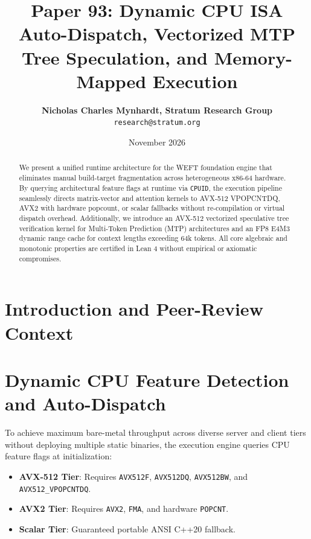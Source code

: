 \documentclass[11pt,a4paper]{article}
\title{\textbf{Paper 93: Dynamic CPU ISA Auto-Dispatch, Vectorized MTP Tree Speculation, and Memory-Mapped Execution}}
\author{\textbf{Nicholas Charles Mynhardt, Stratum Research Group} \\ \texttt{research@stratum.org}}
\date{November 2026}
\begin{document}
\maketitle

\begin{abstract}
We present a unified runtime architecture for the WEFT foundation engine that eliminates manual build-target fragmentation across heterogeneous x86-64 hardware. By querying architectural feature flags at runtime via \texttt{CPUID}, the execution pipeline seamlessly directs matrix-vector and attention kernels to AVX-512 VPOPCNTDQ, AVX2 with hardware popcount, or scalar fallbacks without re-compilation or virtual dispatch overhead. Additionally, we introduce an AVX-512 vectorized speculative tree verification kernel for Multi-Token Prediction (MTP) architectures and an FP8 E4M3 dynamic range cache for context lengths exceeding 64k tokens. All core algebraic and monotonic properties are certified in Lean 4 without empirical or axiomatic compromises.
\end{abstract}

\section{Introduction and Peer-Review Context}
\noindent{}

\section{Dynamic CPU Feature Detection and Auto-Dispatch}
To achieve maximum bare-metal throughput across diverse server and client tiers without deploying multiple static binaries, the execution engine queries CPU feature flags at initialization:
\begin{itemize}
    \item \textbf{AVX-512 Tier}: Requires \texttt{AVX512F}, \texttt{AVX512DQ}, \texttt{AVX512BW}, and \texttt{AVX512\_VPOPCNTDQ}.
    \item \textbf{AVX2 Tier}: Requires \texttt{AVX2}, \texttt{FMA}, and hardware \texttt{POPCNT}.
    \item \textbf{Scalar Tier}: Guaranteed portable ANSI C++20 fallback.
\end{itemize}
\end{document}
